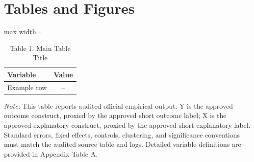 \documentclass[UTF8]{ctexart}
\begin{document}
\section*{Tables and Figures}

\begin{table}[!htbp]
\centering
\caption{Table 1. Main Table Title}
\begin{threeparttable}
\small
\begin{adjustbox}{max width=\textwidth}
\begin{tabular}{lc}
\toprule
Variable & Value \\
\midrule
Example row & -- \\
\bottomrule
\end{tabular}
\end{adjustbox}
\begin{tablenotes}
\footnotesize
\item \textit{Note:} This table reports audited official empirical output. Y is the approved outcome construct, proxied by the approved short outcome label; X is the approved explanatory construct, proxied by the approved short explanatory label. Standard errors, fixed effects, controls, clustering, and significance conventions must match the audited source table and logs. Detailed variable definitions are provided in Appendix Table A.
\end{tablenotes}
\end{threeparttable}
\end{table}

\end{document}
